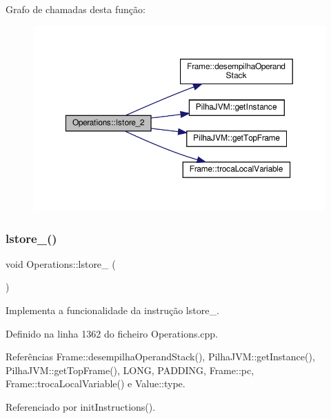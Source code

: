 Grafo de chamadas desta função\+:\nopagebreak
\begin{figure}[H]
\begin{center}
\leavevmode
\includegraphics[width=350pt]{classOperations_a178660c2b3ca2625c140daf867531386_cgraph}
\end{center}
\end{figure}
\mbox{\label{classOperations_a00d5ca7ea5a68e9cccfdc26b11a716bf}} 
\subsubsection{\texorpdfstring{lstore\+\_()}{lstore\_3()}}
{\footnotesize\ttfamily void Operations\+::lstore\+\_ (\begin{DoxyParamCaption}{ }\end{DoxyParamCaption})\hspace{0.3cm}{\ttfamily [private]}}



Implementa a funcionalidade da instrução lstore\+\_. 



Definido na linha 1362 do ficheiro Operations.\+cpp.



Referências Frame\+::desempilha\+Operand\+Stack(), Pilha\+J\+V\+M\+::get\+Instance(), Pilha\+J\+V\+M\+::get\+Top\+Frame(), L\+O\+NG, P\+A\+D\+D\+I\+NG, Frame\+::pc, Frame\+::troca\+Local\+Variable() e Value\+::type.



Referenciado por init\+Instructions().

